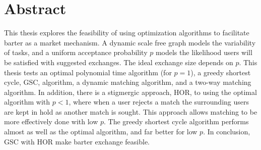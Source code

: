 \documentclass[main.tex]{subfiles}
\begin{document}
\section{Abstract}
This thesis explores the feasibility of using optimization algorithms to facilitate barter as a market mechanism. A dynamic scale free graph models the variability of tasks, and a uniform acceptance probability $p$ models the likelihood users will be satisfied with suggested exchanges. The ideal exchange size depends on $p$. This thesis tests an optimal polynomial time algorithm (for $p=1$), a greedy shortest cycle, GSC, algorithm, a dynamic matching algorithm, and a two-way matching algorithm. In addition, there is a stigmergic approach, HOR, to using the optimal algorithm with $p < 1$, where when a user rejects a match the surrounding users are kept in hold as another match is sought. This approach allows matching to be more effectively done with low $p$. The greedy shortest cycle algorithm performs almost as well as the optimal algorithm, and far better for low $p$. In conclusion, GSC with HOR make barter exchange feasible.
\end{document}
